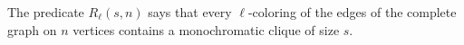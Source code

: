 \begin{definition}
The predicate \(R_\ell(s,n)\) says that every \(\ell\)-coloring of the edges of the complete graph on \(n\) vertices contains a monochromatic clique of size \(s\).
\end{definition}
